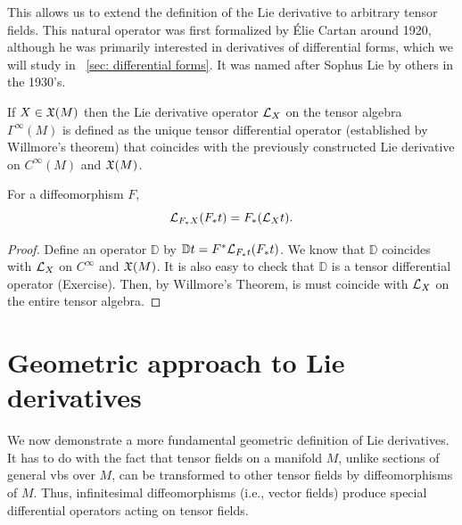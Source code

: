 This allows us to extend the definition of the Lie derivative to arbitrary tensor fields. This natural operator was first formalized by \'Elie Cartan around 1920, although he was primarily interested in derivatives of differential forms, which we will study in \Sect~\ref{sec: differential forms}. It was named after Sophus Lie by others in the 1930's.

\begin{defn}
    If $X\in\mathfrak{X}(M)$ then the Lie derivative operator $\mathcal{L}_X$ on the tensor algebra $\Gamma^\infty(M)$ is defined as the unique tensor differential operator (established by Willmore's theorem) that coincides with the previously constructed Lie derivative on $C^\infty(M)$ and $\mathfrak{X}(M)$.
\end{defn}

\begin{prop}\label{pullbacks of Lie derivatives}
For a diffeomorphism $F$, 
\[\mathcal{L}_{F_\ast X}(F_\ast t)=F_\ast (\mathcal{L}_X t).\]
\end{prop}
\begin{proof}
    Define an operator $\mathbb{D}$ by $\mathbb{D}t=F^\ast \mathcal{L}_{F_\ast t}(F_\ast t)$. We know that $\mathbb{D}$ coincides with $\mathcal{L}_X$ on $C^\infty$ and $\mathfrak{X}(M)$. It is also easy to check that $\mathbb{D}$ is a tensor differential operator (Exercise). Then, by Willmore's Theorem, is must coincide with $\mathcal{L}_X$ on the entire tensor algebra.
\end{proof}

\section{Geometric approach to Lie derivatives}

We now demonstrate a more fundamental geometric definition of Lie derivatives. It has to do with the fact that tensor fields on a manifold $M$, unlike sections of general \glspl{vb} over $M$, can be transformed to other tensor fields by diffeomorphisms of $M$. Thus, infinitesimal diffeomorphisms (i.e., vector fields) produce special differential operators acting on tensor fields.

